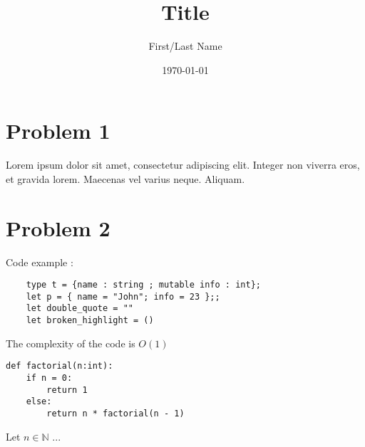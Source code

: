 \documentclass{article}
\title{Title}
\date{\today}
\author{First/Last Name}
\newcommand{\bb}[1]{\mathbb{#1}}
\begin{document}


\thispagestyle{firstpage}

\begin{center}
    \huge\bfseries{\@title}
\end{center}

\section{Problem 1}

\begin{question}
\item Lorem ipsum dolor sit amet, consectetur adipiscing elit. Integer non viverra 
eros, et gravida lorem. Maecenas vel varius neque. Aliquam.
\end{question}

\section{Problem 2}

\begin{question}
\item \begin{question}
    \item Code example : 
        \begin{verbatim}
    type t = {name : string ; mutable info : int};
    let p = { name = "John"; info = 23 };;
    let double_quote = ""
    let broken_highlight = ()
        \end{verbatim}
    \item The complexity of the code is $O(1)$
    \end{question}
	
\item 
	\begin{verbatim}
def factorial(n:int):
	if n = 0:
		return 1
	else:
		return n * factorial(n - 1)
	\end{verbatim}
    \item \begin{question}
        \item Let $n \in \bb{N}$ ...
    \end{question}
\end{question}
\end{document}
